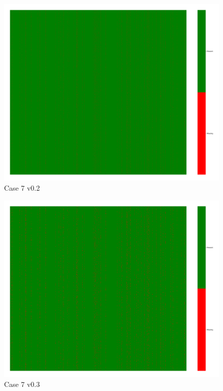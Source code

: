 \documentclass[a4paper,12pt]{article}
\begin{document}
\begin{figure}[H]
    \includegraphics[width=\linewidth]{case8_v0.2_heatmap_cleaned.png}
    \caption*{Case 7 v0.2}
\end{figure}

\begin{figure}[H]
    \includegraphics[width=\linewidth]{case8_v0.3_heatmap_cleaned.png}
    \caption*{Case 7 v0.3}
\end{figure}
\end{document}
